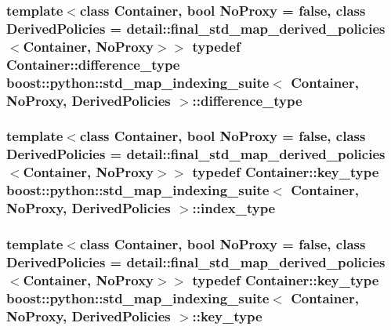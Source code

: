 \hypertarget{classboost_1_1python_1_1std__map__indexing__suite_a54aa644dcb3913334f8b0152901940ef}{
\subsubsection[{difference\-\_\-type}]{\setlength{\rightskip}{0pt plus 5cm}template$<$class \-Container, bool \-No\-Proxy = false, class \-Derived\-Policies = detail\-::final\-\_\-std\-\_\-map\-\_\-derived\-\_\-policies$<$\-Container, No\-Proxy$>$$>$ typedef \-Container\-::difference\-\_\-type {\bf boost\-::python\-::std\-\_\-map\-\_\-indexing\-\_\-suite}$<$ \-Container, \-No\-Proxy, \-Derived\-Policies $>$\-::{\bf difference\-\_\-type}}}\label{classboost_1_1python_1_1std__map__indexing__suite_a54aa644dcb3913334f8b0152901940ef}
\hypertarget{classboost_1_1python_1_1std__map__indexing__suite_a4b2ac75883fba93dbca6d9e83197c842}{
\subsubsection[{index\-\_\-type}]{\setlength{\rightskip}{0pt plus 5cm}template$<$class \-Container, bool \-No\-Proxy = false, class \-Derived\-Policies = detail\-::final\-\_\-std\-\_\-map\-\_\-derived\-\_\-policies$<$\-Container, No\-Proxy$>$$>$ typedef \-Container\-::key\-\_\-type {\bf boost\-::python\-::std\-\_\-map\-\_\-indexing\-\_\-suite}$<$ \-Container, \-No\-Proxy, \-Derived\-Policies $>$\-::{\bf index\-\_\-type}}}\label{classboost_1_1python_1_1std__map__indexing__suite_a4b2ac75883fba93dbca6d9e83197c842}
\hypertarget{classboost_1_1python_1_1std__map__indexing__suite_a4e2daeb60a58d6ce9964e0ea27680009}{
\subsubsection[{key\-\_\-type}]{\setlength{\rightskip}{0pt plus 5cm}template$<$class \-Container, bool \-No\-Proxy = false, class \-Derived\-Policies = detail\-::final\-\_\-std\-\_\-map\-\_\-derived\-\_\-policies$<$\-Container, No\-Proxy$>$$>$ typedef \-Container\-::key\-\_\-type {\bf boost\-::python\-::std\-\_\-map\-\_\-indexing\-\_\-suite}$<$ \-Container, \-No\-Proxy, \-Derived\-Policies $>$\-::{\bf key\-\_\-type}}}\label{classboost_1_1python_1_1std__map__indexing__suite_a4e2daeb60a58d6ce9964e0ea27680009}
